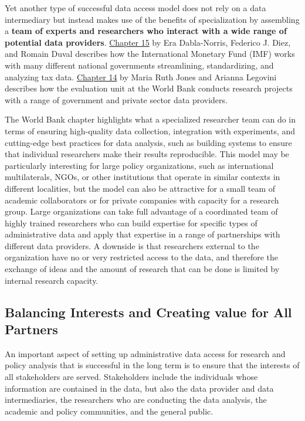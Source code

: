 \documentclass[
]{book}
\begin{document}
Yet another type of successful data access model does not rely on a data intermediary but instead makes use of the benefits of specialization by assembling a \textbf{team of experts and researchers who interact with a wide range of potential data providers}. \protect\hyperlink{imf}{Chapter 15} by Era Dabla-Norris, Federico J. Diez, and Romain Duval describes how the International Monetary Fund (IMF) works with many different national governments streamlining, standardizing, and analyzing tax data. \protect\hyperlink{dime}{Chapter 14} by Maria Ruth Jones and Arianna Legovini describes how the evaluation unit at the World Bank conducts research projects with a range of government and private sector data providers.

The World Bank chapter highlights what a specialized researcher team can do in terms of ensuring high-quality data collection, integration with experiments, and cutting-edge best practices for data analysis, such as building systems to ensure that individual researchers make their results reproducible. This model may be particularly interesting for large policy organizations, such as international multilaterals, NGOs, or other institutions that operate in similar contexts in different localities, but the model can also be attractive for a small team of academic collaborators or for private companies with capacity for a research group. Large organizations can take full advantage of a coordinated team of highly trained researchers who can build expertise for specific types of administrative data and apply that expertise in a range of partnerships with different data providers. A downside is that researchers external to the organization have no or very restricted access to the data, and therefore the exchange of ideas and the amount of research that can be done is limited by internal research capacity.

\hypertarget{balancing-interests-and-creating-value-for-all-partners}{%
\subsection{Balancing Interests and Creating value for All Partners}\label{balancing-interests-and-creating-value-for-all-partners}}

An important aspect of setting up administrative data access for research and policy analysis that is successful in the long term is to ensure that the interests of all stakeholders are served. Stakeholders include the individuals whose information are contained in the data, but also the data provider and data intermediaries, the researchers who are conducting the data analysis, the academic and policy communities, and the general public.
\end{document}
